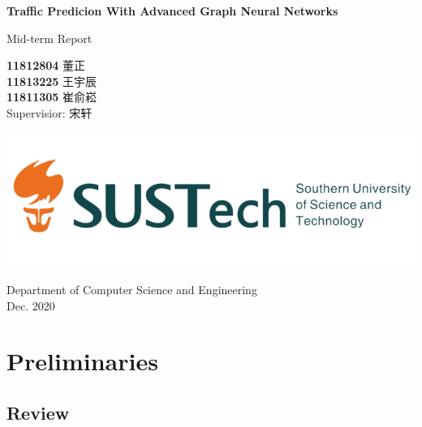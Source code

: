\documentclass[fontset=none]{ctexart}
\theoremstyle{definition}
\theoremstyle{remark}
\begin{document}
\begin{titlepage}
    \begin{center}
        \vspace*{1cm}
            
        \Huge
        \textbf{Traffic Predicion With Advanced Graph Neural Networks}
            
        \vspace{0.5cm}
        \LARGE
        Mid-term Report\\
            
        \vspace{1.5cm}
            
        \textbf{11812804}  董\quad 正\\
        \textbf{11813225}  王宇辰\\
        \textbf{11811305}  崔俞崧\\

        \vspace{0.5cm}
        Supervisior: 宋轩
            
        \vfill
            
        \includegraphics[width=\textwidth]{images/sustc.png}
            
        \vspace{0.2cm}
            
        \Large
        Department of Computer Science and Engineering\\
        \vspace{0.5cm}
        Dec. 2020
            
    \end{center}
\end{titlepage}

\tableofcontents

\clearpage
\section{Preliminaries}
\subsection{Review}
\end{document}
